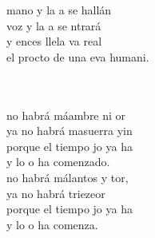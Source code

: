 \begin{cancion}%
	\begin{chorus}%
	 mano y la a se hallán\\
	 voz y la a se ntrará\\
	y ences llela va real\\
	el procto de una eva humani.\\
	\end{chorus}%
	\jump\\
	  \\
	no habrá máambre ni or\\
	ya no habrá masuerra yin\\
	porque el tiempo jo ya ha \\
	y lo o ha comenzado.\\
\jump
	no habrá málantos y tor, \\
	ya no habrá triezeor\\
	porque el tiempo jo ya ha \\
	y lo o ha comenza.\\
\end{cancion}%
